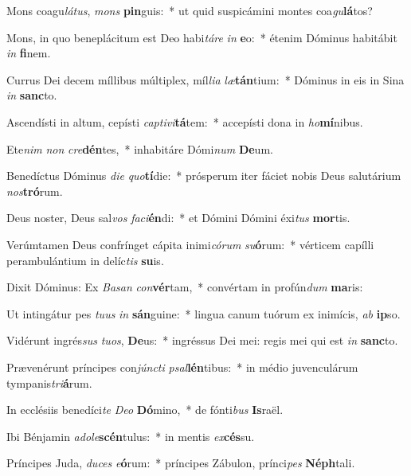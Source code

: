 \item Mons coagu\textit{lá}\textit{tus}, \textit{mons} \textbf{pin}guis:~* ut quid suspicámini montes coa\textit{gu}\textbf{lá}tos?
\item Mons, in quo beneplácitum est Deo habi\textit{tá}\textit{re} \textit{in} \textbf{e}o:~* étenim Dóminus habitábit \textit{in} \textbf{fi}nem.
\item Currus Dei decem míllibus múltiplex, míl\textit{li}\textit{a} \textit{læ}\textbf{tán}tium:~* Dóminus in eis in Sina \textit{in} \textbf{sanc}to.
\item Ascendísti in altum, cepísti \textit{cap}\textit{ti}\textit{vi}\textbf{tá}tem:~* accepísti dona in \textit{ho}\textbf{mí}nibus.
\item Ete\textit{nim} \textit{non} \textit{cre}\textbf{dén}tes,~* inhabitáre Dómi\textit{num} \textbf{De}um.
\item Benedíctus Dóminus \textit{di}\textit{e} \textit{quo}\textbf{tí}die:~* prósperum iter fáciet nobis Deus salutárium \textit{nos}\textbf{tró}rum.
\item Deus noster, Deus sal\textit{vos} \textit{fa}\textit{ci}\textbf{én}di:~* et Dómini Dómini éxi\textit{tus} \textbf{mor}tis.
\item Verúmtamen Deus confrínget cápita inimi\textit{có}\textit{rum} \textit{su}\textbf{ó}rum:~* vérticem capílli perambulántium in delíc\textit{tis} \textbf{su}is.
\item Dixit Dóminus: Ex \textit{Ba}\textit{san} \textit{con}\textbf{vér}tam,~* convértam in profún\textit{dum} \textbf{ma}ris:
\item Ut intingátur pes \textit{tu}\textit{us} \textit{in} \textbf{sán}guine:~* lingua canum tuórum ex inimícis, \textit{ab} \textbf{ip}so.
\item Vidérunt ingrés\textit{sus} \textit{tu}\textit{os}, \textbf{De}us:~* ingréssus Dei mei: regis mei qui est \textit{in} \textbf{sanc}to.
\item Prævenérunt príncipes con\textit{júnc}\textit{ti} \textit{psal}\textbf{lén}tibus:~* in médio juvenculárum tympanis\textit{tri}\textbf{á}rum.
\item In ecclésiis benedíci\textit{te} \textit{De}\textit{o} \textbf{Dó}mino,~* de fónti\textit{bus} \textbf{Is}raël.
\item Ibi Bénjamin \textit{ad}\textit{o}\textit{le}\textbf{scén}tulus:~* in mentis \textit{ex}\textbf{cés}su.
\item Príncipes Juda, \textit{du}\textit{ces} \textit{e}\textbf{ó}rum:~* príncipes Zábulon, prínci\textit{pes} \textbf{Néph}tali.
